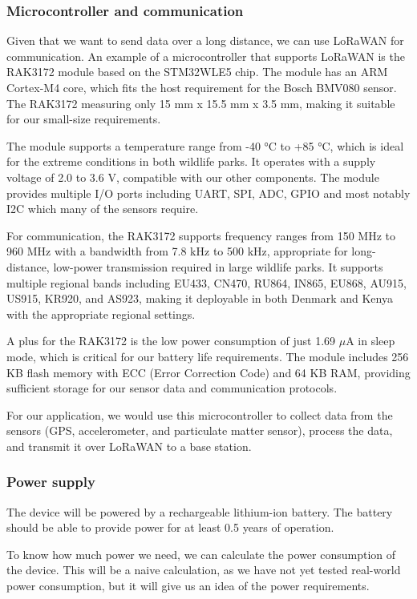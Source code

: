 \subsubsection{Microcontroller and communication}
Given that we want to send data over a long distance, we can use LoRaWAN for communication. An example of a microcontroller that supports LoRaWAN is the RAK3172 module based on the STM32WLE5 chip\cite{rak3172_datasheet}. The module has an ARM Cortex-M4 core, which fits the host requirement for the Bosch BMV080 sensor. The RAK3172 measuring only 15 mm x 15.5 mm x 3.5 mm, making it suitable for our small-size requirements.

The module supports a temperature range from -40 °C to +85 °C, which is ideal for the extreme conditions in both wildlife parks. It operates with a supply voltage of 2.0 to 3.6 V, compatible with our other components. The module provides multiple I/O ports including UART, SPI, ADC, GPIO and most notably I2C which many of the sensors require.

For communication, the RAK3172 supports frequency ranges from 150 MHz to 960 MHz with a bandwidth from 7.8 kHz to 500 kHz, appropriate for long-distance, low-power transmission required in large wildlife parks. It supports multiple regional bands including EU433, CN470, RU864, IN865, EU868, AU915, US915, KR920, and AS923, making it deployable in both Denmark and Kenya with the appropriate regional settings.

A plus for the RAK3172 is the low power consumption of just 1.69 $\mu$A in sleep mode, which is critical for our battery life requirements. The module includes 256 KB flash memory with ECC (Error Correction Code) and 64 KB RAM, providing sufficient storage for our sensor data and communication protocols.

For our application, we would use this microcontroller to collect data from the sensors (GPS, accelerometer, and particulate matter sensor), process the data, and transmit it over LoRaWAN to a base station.

\subsubsection{Power supply}
The device will be powered by a rechargeable lithium-ion battery. The battery should be able to provide power for at least 0.5 years of operation.

To know how much power we need, we can calculate the power consumption of the device. This will be a naive calculation, as we have not yet tested real-world power consumption, but it will give us an idea of the power requirements.

